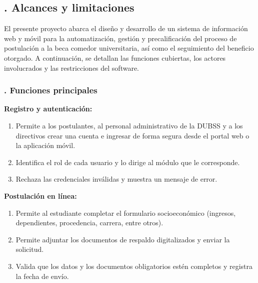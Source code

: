 \subsection{. Alcances y limitaciones}\label{sec:alcances_limitaciones}

El presente proyecto abarca el diseño y desarrollo de un sistema de información web y móvil para la automatización, gestión y precalificación del proceso de postulación a la beca comedor universitaria, así como el seguimiento del beneficio otorgado. A continuación, se detallan las funciones cubiertas, los actores involucrados y las restricciones del software.

\subsubsection{. Funciones principales}\label{sec:funciones_principales}

\newenvironment{incisos}{\begin{enumerate}\renewcommand{\labelenumi}{\alph{enumi})}}{\end{enumerate}}

\noindent\textbf{Registro y autenticación:}
\begin{incisos}
    \item Permite a los postulantes, al personal administrativo de la DUBSS y a los directivos crear una cuenta e ingresar de forma segura desde el portal web o la aplicación móvil.
    \item Identifica el rol de cada usuario y lo dirige al módulo que le corresponde.
    \item Rechaza las credenciales inválidas y muestra un mensaje de error.
\end{incisos}

\noindent\textbf{Postulación en línea:}
\begin{incisos}
    \item Permite al estudiante completar el formulario socioeconómico (ingresos, dependientes, procedencia, carrera, entre otros).
    \item Permite adjuntar los documentos de respaldo digitalizados y enviar la solicitud.
    \item Valida que los datos y los documentos obligatorios estén completos y registra la fecha de envío.
\end{incisos}


